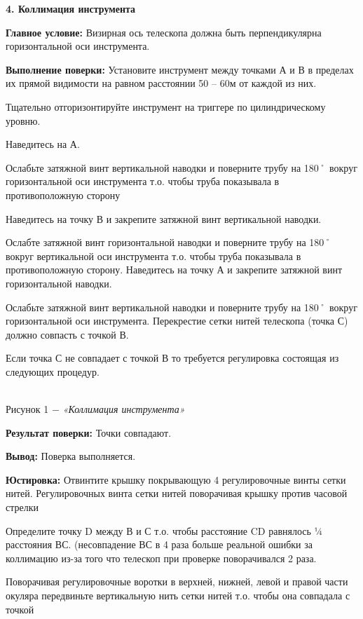 \documentclass[a4paper]{article}
\begin{document}
{\par\textbf{4. Коллимация инструмента}
\par \textbf{Главное условие:} Визирная ось телескопа должна быть перпендикулярна горизонтальной оси инструмента.
\par \textbf{Выполнение поверки:} Установите инструмент между точками А и В в пределах их прямой видимости на равном расстоянии 50 – 60м от каждой из них.
\par Тщательно отгоризонтируйте инструмент на триггере по цилиндрическому уровню.
\par Наведитесь на А.
\par Ослабьте затяжной винт вертикальной наводки и поверните трубу на 180˚ вокруг горизонтальной оси инструмента т.о. чтобы труба показывала в
противоположную сторону
\par Наведитесь на точку В и закрепите затяжной винт вертикальной наводки.
\par Ослабте затяжной винт горизонтальной наводки и поверните трубу на 180˚ вокруг вертикальной оси инструмента т.о. чтобы труба показывала в
противоположную сторону. Наведитесь на точку А и закрепите затяжной винт
горизонтальной наводки.
\par Ослабьте затяжной винт вертикальной наводки и поверните трубу на 180˚
вокруг горизонтальной оси инструмента. Перекрестие сетки нитей телескопа (точка С)
должно совпасть с точкой В.
\par Если точка С не совпадает с точкой В то требуется регулировка состоящая из
следующих процедур.
\begin{center}
    \\
    Рисунок 1 $-$ \textit{«Коллимация инструмента»}  
\end{center}
\par \textbf{Результат поверки:} Точки совпадают.
\par\textbf{Вывод:} Поверка выполняется.
\par \textbf{Юстировка:} Отвинтите крышку покрывающую 4 регулировочные винты сетки нитей. Регулировочных винта сетки нитей поворачивая крышку против часовой стрелки
\par Определите точку D между В и С т.о. чтобы расстояние CD равнялось ¼ расстояния ВС. (несовпадение ВС в 4 раза больше реальной ошибки за коллимацию из-за того что телескоп при проверке поворачивался 2 раза.
\par Поворачивая регулировочные воротки в верхней, нижней, левой и правой части
окуляра передвиньте вертикальную нить сетки нитей т.о. чтобы она совпадала с точкой
}
\end{document}
